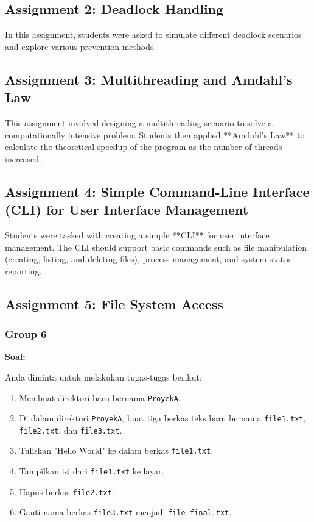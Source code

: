 \documentclass[12pt]{article}
\begin{document}
\subsection{Assignment 2: Deadlock Handling}
In this assignment, students were asked to simulate different deadlock scenarios and explore various prevention methods.

\subsection{Assignment 3: Multithreading and Amdahl's Law}
This assignment involved designing a multithreading scenario to solve a computationally intensive problem. Students then applied **Amdahl's Law** to calculate the theoretical speedup of the program as the number of threads increased.

\subsection{Assignment 4: Simple Command-Line Interface (CLI) for User Interface Management}
Students were tasked with creating a simple **CLI** for user interface management. The CLI should support basic commands such as file manipulation (creating, listing, and deleting files), process management, and system status reporting.

\subsection{Assignment 5: File System Access}
\subsubsection{Group 6}
\textbf{Soal:}

Anda diminta untuk melakukan tugas-tugas berikut:

\begin{enumerate}
    \item Membuat direktori baru bernama \texttt{ProyekA}.
    \item Di dalam direktori \texttt{ProyekA}, buat tiga berkas teks baru bernama \texttt{file1.txt}, \texttt{file2.txt}, dan \texttt{file3.txt}.
    \item Tuliskan "Hello World" ke dalam berkas \texttt{file1.txt}.
    \item Tampilkan isi dari \texttt{file1.txt} ke layar.
    \item Hapus berkas \texttt{file2.txt}.
    \item Ganti nama berkas \texttt{file3.txt} menjadi \texttt{file\_final.txt}.
\end{enumerate}
\end{document}
